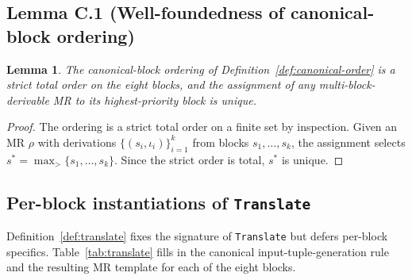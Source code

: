 \documentclass[manuscript]{acmart}
\newtheorem{lemma}{Lemma}
\begin{document}
\subsection*{Lemma C.1 (Well-foundedness of canonical-block ordering)}

\begin{lemma}
\label{lem:canonical-order}
The canonical-block ordering of Definition~\ref{def:canonical-order} is a strict total order on the eight blocks, and the assignment of any multi-block-derivable MR to its highest-priority block is unique.
\end{lemma}

\begin{proof}
The ordering is a strict total order on a finite set by inspection. Given an MR $\rho$ with derivations $\{(s_i, \iota_i)\}_{i=1}^{k}$ from blocks $s_1, \ldots, s_k$, the assignment selects $s^{*} = \max_{>}\{s_1, \ldots, s_k\}$. Since the strict order is total, $s^{*}$ is unique.
\end{proof}

\subsection*{Per-block instantiations of \texttt{Translate}}
\label{app:translate-table}

Definition~\ref{def:translate} fixes the signature of \texttt{Translate} but defers per-block specifics. Table~\ref{tab:translate} fills in the canonical input-tuple-generation rule and the resulting MR template for each of the eight blocks.
\end{document}
